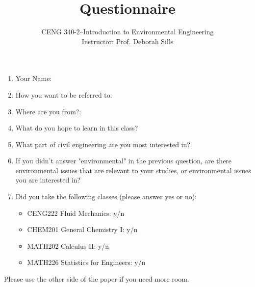 \documentclass[12pt,letterpaper]{article}
\begin{document}
\setlength{\parindent}{0cm} 


\frenchspacing

\title {Questionnaire} 
\author {CENG 340-2--Introduction to Environmental Engineering\\
Instructor: Prof. Deborah Sills}
\maketitle
\begin{enumerate}
\item Your Name:
\item How you want to be referred to:
\item Where are you from?:\\
\item What do you hope to learn in this class?\\
\vspace{1 in}
\item What part of civil engineering are you most interested in?\\
\vspace{0.5 in}
\item If you didn't answer "environmental" in the previous question, are there environmental issues that are relevant to your studies, or environmental issues you are interested in?\\ 
\vspace{0.6 in}
\item Did you take the following classes (please answer yes or no):
\begin{itemize}
\item CENG222 Fluid Mechanics: y/n
\item CHEM201 General Chemistry I: y/n
\item MATH202 Calculus II: y/n
\item MATH226 Statistics for Engineers: y/n
\end{itemize}

\end{enumerate}
\vspace{0.2 in}
Please use the other side of the paper if you need more room.
\end{document}
